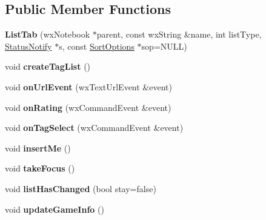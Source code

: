 \subsection*{Public Member Functions}
\begin{DoxyCompactItemize}
\item 
\hypertarget{struct_list_tab_ae6cd15376dc53a931817fba5f1106dc4}{{\bfseries List\-Tab} (wx\-Notebook $\ast$parent, const wx\-String \&name, int list\-Type, \hyperlink{struct_status_notify}{Status\-Notify} $\ast$s, const \hyperlink{struct_sort_options}{Sort\-Options} $\ast$sop=N\-U\-L\-L)}\label{struct_list_tab_ae6cd15376dc53a931817fba5f1106dc4}

\item 
\hypertarget{struct_list_tab_a7d2c1821b95a97f4586d52df15bc1e30}{void {\bfseries create\-Tag\-List} ()}\label{struct_list_tab_a7d2c1821b95a97f4586d52df15bc1e30}

\item 
\hypertarget{struct_list_tab_ad329091d9da6e2bcb40f6073dc3564ee}{void {\bfseries on\-Url\-Event} (wx\-Text\-Url\-Event \&event)}\label{struct_list_tab_ad329091d9da6e2bcb40f6073dc3564ee}

\item 
\hypertarget{struct_list_tab_a0787fa1f6df1f6fe44326a5a144895ca}{void {\bfseries on\-Rating} (wx\-Command\-Event \&event)}\label{struct_list_tab_a0787fa1f6df1f6fe44326a5a144895ca}

\item 
\hypertarget{struct_list_tab_aeaa3bc9c78c225387d50c6f8c2b7f036}{void {\bfseries on\-Tag\-Select} (wx\-Command\-Event \&event)}\label{struct_list_tab_aeaa3bc9c78c225387d50c6f8c2b7f036}

\item 
\hypertarget{struct_list_tab_ab8df7d076344af460db847ee365c9f55}{void {\bfseries insert\-Me} ()}\label{struct_list_tab_ab8df7d076344af460db847ee365c9f55}

\item 
\hypertarget{struct_list_tab_ae57fa84a43f1e1ad95ee2747247f749d}{void {\bfseries take\-Focus} ()}\label{struct_list_tab_ae57fa84a43f1e1ad95ee2747247f749d}

\item 
\hypertarget{struct_list_tab_a70c339cd735a3a3b45a9e6a5649ebe83}{void {\bfseries list\-Has\-Changed} (bool stay=false)}\label{struct_list_tab_a70c339cd735a3a3b45a9e6a5649ebe83}

\item 
\hypertarget{struct_list_tab_a73445ff0fc8883e21d1ed20a051d95fc}{void {\bfseries update\-Game\-Info} ()}\label{struct_list_tab_a73445ff0fc8883e21d1ed20a051d95fc}


\end{DoxyCompactItemize}
